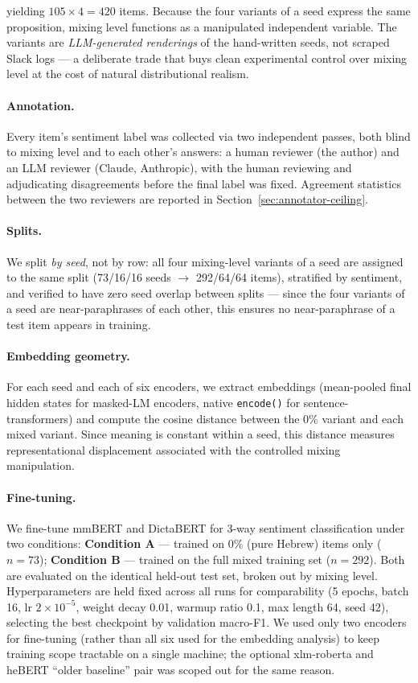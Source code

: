 \documentclass{article}
\begin{document}
\noindent yielding $105\times4=420$ items. Because the four variants of a seed
express the same proposition, mixing level functions as a manipulated
independent variable. The variants are \emph{LLM-generated renderings} of the
hand-written seeds, not scraped Slack logs --- a deliberate trade that buys
clean experimental control over mixing level at the cost of natural
distributional realism.

\paragraph{Annotation.} Every item's sentiment label was collected via two
independent passes, both blind to mixing level and to each other's answers: a
human reviewer (the author) and an LLM reviewer (Claude, Anthropic), with the
human reviewing and adjudicating disagreements before the final label was
fixed. Agreement statistics between the two reviewers are reported in
Section~\ref{sec:annotator-ceiling}.

\paragraph{Splits.} We split \emph{by seed}, not by row: all four mixing-level
variants of a seed are assigned to the same split (73/16/16 seeds
$\rightarrow$ 292/64/64 items), stratified by sentiment, and verified to have
zero seed overlap between splits --- since the four variants of a seed are
near-paraphrases of each other, this ensures no near-paraphrase of a test item
appears in training.

\paragraph{Embedding geometry.} For each seed and each of six encoders, we
extract embeddings (mean-pooled final hidden states for masked-LM encoders,
native \texttt{encode()} for sentence-transformers) and compute the cosine
distance between the 0\% variant and each mixed variant. Since meaning is
constant within a seed, this distance measures representational displacement
associated with the controlled mixing manipulation.

\paragraph{Fine-tuning.} We fine-tune mmBERT and DictaBERT for 3-way sentiment
classification under two conditions: \textbf{Condition A} --- trained on 0\%
(pure Hebrew) items only ($n=73$); \textbf{Condition B} --- trained on the
full mixed training set ($n=292$). Both are evaluated on the identical
held-out test set, broken out by mixing level. Hyperparameters are held fixed
across all runs for comparability (5 epochs, batch 16, lr $2\times10^{-5}$,
weight decay 0.01, warmup ratio 0.1, max length 64, seed 42), selecting the
best checkpoint by validation macro-F1. We used only two encoders for
fine-tuning (rather than all six used for the embedding analysis) to keep
training scope tractable on a single machine; the optional xlm-roberta and
heBERT ``older baseline'' pair was scoped out for the same reason.
\end{document}
